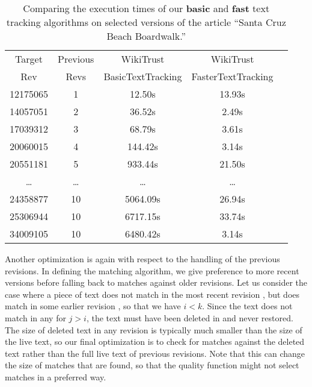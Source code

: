\begin{table}
\begin{center}
\begin{tabular}{| c | c || c || c | c |}
\hline
Target & Previous & WikiTrust & WikiTrust \\
Rev & Revs & BasicTextTracking & FasterTextTracking \\
\hline
12175065 & 1 & 12.50s & 13.93s \\
14057051 & 2 & 36.52s & 2.49s \\
17039312 & 3 & 68.79s & 3.61s \\
20060015 & 4 & 144.42s & 3.14s \\
20551181 & 5 & 933.44s & 21.50s \\
\ldots & \ldots & \ldots & \ldots \\
24358877 & 10 & 5064.09s & 26.94s \\
25306944 & 10 & 6717.15s & 33.74s \\
34009105 & 10 & 6480.42s & 3.14s \\
\hline
\end{tabular}
\end{center}
\caption[Comparing execution times of our two
    text tracking algorithms.]{Comparing the execution times of our
    \textbf{basic} and \textbf{fast} text tracking
    algorithms on selected versions of the article
    ``Santa Cruz Beach Boardwalk.''}
\label{tab:comparetext}
\end{table}


Another optimization is again with respect to the handling of the
previous revisions.
In defining the matching algorithm, we give preference to more recent
versions before falling back to matches against older revisions.
Let us consider the case where a piece of text does not match in the
most recent revision ,
but does match in some earlier revision , so that we have $i < k$.
Since the text does not match in any  for $j > i$,
the text must have been deleted in  and
never restored.
The size of deleted text in any revision is typically much smaller
than the size of the live text, so our final optimization is
to check for matches against the deleted text rather than the full
live text of previous revisions.
Note that this can change the size of matches that are found,
so that the quality function might not select matches in a preferred way.

